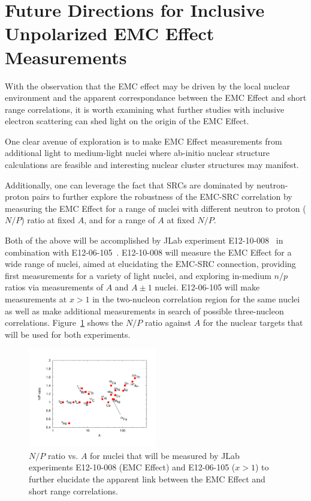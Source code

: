 \section{Future Directions for Inclusive Unpolarized EMC Effect Measurements}

With the observation that the EMC effect may be driven by the local nuclear environment
and the apparent correspondance between the EMC Effect and short range correlations, it is worth examining what
further studies with inclusive electron scattering can shed light on the origin of the EMC Effect.

One clear avenue of exploration is to make EMC Effect measurements from additional light to medium-light
nuclei where ab-initio nuclear structure calculations are feasible and interesting nuclear cluster
structures may manifest.

Additionally, one can leverage the fact that SRCs are dominated by neutron-proton pairs to further explore
the robustness of the EMC-SRC correlation by measuring the EMC Effect for a range of nuclei with
different neutron to proton ($N/P$) ratio at fixed $A$, and for a range of $A$ at fixed $N/P$.

Both of the above will be accomplished by JLab experiment E12-10-008~\cite{12gev_emc} in combination
with E12-06-105~\cite{12gev_xgt1}. E12-10-008 will measure the EMC Effect for a wide range of nuclei,
aimed at elucidating the EMC-SRC connection, providing first measurements for a variety of light nuclei,
and exploring in-medium $n/p$ ratios via measurements of $A$ and $A\pm1$ nuclei.  E12-06-105 will make
measurements at $x>1$ in the two-nucleon correlation region for the same nuclei as well as make additional
measurements in search of possible three-nucleon correlations. Figure~\ref{fig:np_ratios} shows the $N/P$
ratio against $A$ for the nuclear targets that will be used for both experiments.

\begin{figure}[htb]
  \includegraphics[width=0.5\textwidth]{plots/np_ratios_2017.pdf}
  \caption{$N/P$ ratio vs. $A$ for nuclei that will be measured by JLab experiments E12-10-008 (EMC Effect)
    and E12-06-105 ($x>1$) to further elucidate the apparent link between the EMC Effect and short range
    correlations.}
  \label{fig:np_ratios}
\end{figure}
